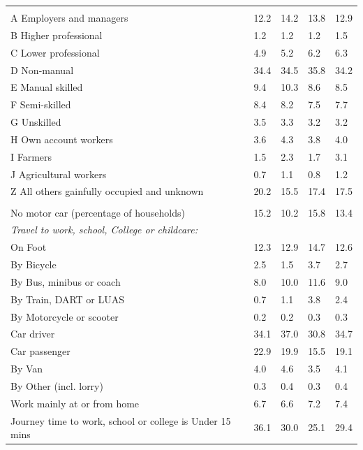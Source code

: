 \documentclass{article}
\begin{document}
\begin{table}[h]
\begin{tabular}{KTTTT}
\hline
    \\ 
    \hline
A Employers and managers & 12.2& 14.2& 13.8& 12.9\\
B Higher professional & 1.2& 1.2& 1.2& 1.5\\
C Lower professional & 4.9& 5.2& 6.2& 6.3\\
D Non-manual & 34.4& 34.5& 35.8& 34.2\\
E Manual skilled &  9.4& 10.3&  8.6&  8.5\\
F Semi-skilled & 8.4& 8.2& 7.5& 7.7\\
G Unskilled & 3.5& 3.3& 3.2& 3.2\\
H Own account workers & 3.6& 4.3& 3.8& 4.0\\
I Farmers & 1.5& 2.3& 1.7& 3.1\\
J Agricultural workers & 0.7& 1.1& 0.8& 1.2\\
Z All others gainfully occupied and unknown & 20.2& 15.5& 17.4& 17.5\\
\hline
{}\hline
    \\ 
    \hline
No motor car (percentage of households) & 15.2& 10.2& 15.8& 
13.4\\
    \hline 
\emph{Travel to work, school, College or childcare:} & & & \\
\quad On Foot & 12.3& 12.9& 14.7& 12.6\\ 
\quad By Bicycle & 2.5& 1.5& 3.7& 2.7\\ 
\quad By Bus, minibus or coach &  8.0& 10.0& 11.6&  9.0\\
\quad By Train, DART or LUAS & 0.7& 1.1& 3.8& 2.4\\
\quad By Motorcycle or scooter & 0.2& 0.2& 0.3& 0.3\\
\quad Car driver & 34.1 & 37.0& 30.8& 34.7\\
\quad Car passenger & 22.9& 19.9& 15.5& 19.1\\
\quad By Van & 4.0& 4.6& 3.5& 4.1\\
\quad By Other (incl. lorry) & 0.3& 0.4& 0.3& 0.4\\
    \hline
Work mainly at or from home & 6.7& 6.6& 7.2& 7.4\\
Journey time to work, school or college is Under 15 mins & 36.1& 30.0& 25.1& 29.4\\

\end{tabular}
\end{table}
\end{document}
